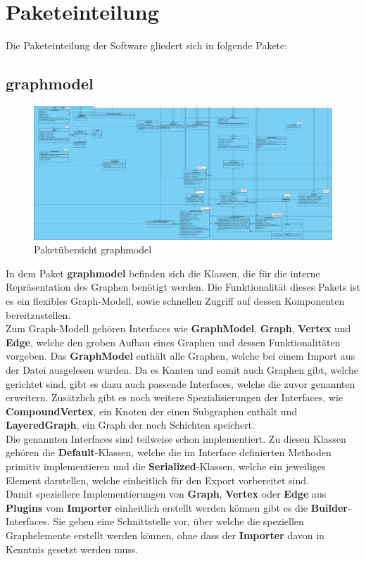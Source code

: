 \chapter{Paketeinteilung}
\label{ch:paketeinteilung}

Die Paketeinteilung der Software gliedert sich in folgende Pakete: %

\section{graphmodel}
\label{sec:graphmodel}
\begin{figure}[hb]
  \centering
  \includegraphics[width=380pt]{resourcen/graphmodel.png}
  \caption{Paketübersicht graphmodel}
  \label{fig:packge_graphmodel}
\end{figure}

In dem Paket \textbf{graphmodel} befinden sich die Klassen, die für die interne Repräsentation des Graphen benötigt werden. Die Funktionalität dieses Pakets ist es ein flexibles Graph-Modell, sowie schnellen Zugriff auf dessen Komponenten bereitzustellen.\\ 
Zum Graph-Modell gehören Interfaces wie \textbf{GraphModel}, \textbf{Graph}, \textbf{Vertex} und \textbf{Edge}, welche den groben Aufbau eines Graphen und dessen Funktionalitäten vorgeben. Das \textbf{GraphModel} enthält alle Graphen, welche bei einem Import aus der Datei ausgelesen wurden. Da es Kanten und somit auch Graphen gibt, welche gerichtet sind, gibt es dazu auch passende Interfaces, welche die zuvor genannten erweitern. Zusätzlich gibt es noch weitere Spezialisierungen der Interfaces, wie \textbf{CompoundVertex}, ein Knoten der einen Subgraphen enthält und \textbf{LayeredGraph}, ein Graph der noch Schichten speichert.\\
Die genannten Interfaces sind teilweise schon implementiert. Zu diesen Klassen gehören die \textbf{Default}-Klassen, welche die im Interface definierten Methoden primitiv implementieren und die \textbf{Serialized}-Klassen, welche ein jeweiliges Element darstellen, welche einheitlich für den Export vorbereitet sind. \\
Damit speziellere Implementierungen von \textbf{Graph}, \textbf{Vertex} oder \textbf{Edge} aus \textbf{Plugins} vom \textbf{Importer} einheitlich erstellt werden können gibt es die \textbf{Builder}-Interfaces. Sie geben eine Schnittstelle vor, über welche die speziellen Graphelemente erstellt werden können, ohne dass der \textbf{Importer} davon in Kenntnis gesetzt werden muss.

